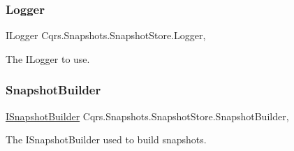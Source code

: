 \subsubsection{\texorpdfstring{Logger}{Logger}}
{\footnotesize\ttfamily I\+Logger Cqrs.\+Snapshots.\+Snapshot\+Store.\+Logger\hspace{0.3cm}{\ttfamily [get]}, {\ttfamily [protected]}}



The I\+Logger to use. 

\mbox{\label{classCqrs_1_1Snapshots_1_1SnapshotStore_a467ad1be01ccaaff23868a9ce4985746_a467ad1be01ccaaff23868a9ce4985746}} 
\subsubsection{\texorpdfstring{Snapshot\+Builder}{SnapshotBuilder}}
{\footnotesize\ttfamily \hyperlink{interfaceCqrs_1_1Events_1_1ISnapshotBuilder}{I\+Snapshot\+Builder} Cqrs.\+Snapshots.\+Snapshot\+Store.\+Snapshot\+Builder\hspace{0.3cm}{\ttfamily [get]}, {\ttfamily [protected]}}



The I\+Snapshot\+Builder used to build snapshots. 

